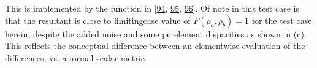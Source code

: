 \documentclass[letterpaper,table,10pt,english]{jupyterBook}
\begin{document}
\sphinxAtStartPar
This is implemented by the  function in  {[}\hyperlink{cite.backmatter/bibliography:id689}{94}, \hyperlink{cite.backmatter/bibliography:id690}{95}, \hyperlink{cite.backmatter/bibliography:id813}{96}{]}. Of note in this test case is that the resultant is close to limiting\sphinxhyphen{}case value of \(F(\rho_{a},\rho_{b})=1\) for the test case herein, despite the added noise and some per\sphinxhyphen{}element disparities as shown in   (c). This reflects the conceptual difference between an element\sphinxhyphen{}wise evaluation of the differences, vs. a formal scalar metric.
\end{document}
